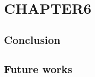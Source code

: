 \chapter{CHAPTER6}

\ifpdf
    \graphicspath{{Chapter6/Figs/Raster/}{Chapter6/Figs/PDF/}{Chapter6/Figs/}}
\else
    \graphicspath{{Chapter6/Figs/Vector/}{Chapter6/Figs/}}
\fi

\section{Conclusion}



\section{Future works}
